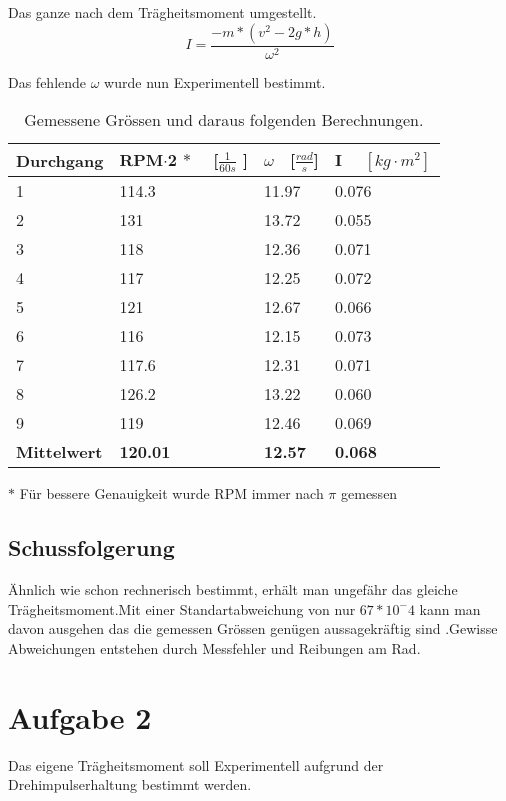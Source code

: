 \documentclass{article}
\begin{document}
Das ganze nach dem Trägheitsmoment umgestellt.
\begin{equation}
I=\frac{-m*(v^2-2g*h)}{\omega^2}
\end{equation}

Das fehlende $\omega$ wurde nun Experimentell bestimmt.


\begin{table}[H]
\center
    \begin{tabular}{|l|l|l|l|}
        \hline
        
  
        Durchgang & RPM$\cdot$2 $\ast$ $ \quad $[$\frac{1}{60s}$ ]   & $\omega \quad $[$\frac{rad}{s}$] & I $\quad [kg\cdot m^2]$ \\ \hline
        1         & 114.3 & 11.97 & 0.076 \\ 
        2         & 131   & 13.72 & 0.055 \\ 
        3         & 118   & 12.36 & 0.071 \\ 
        4         & 117   & 12.25 & 0.072 \\ 
        5         & 121   & 12.67 & 0.066 \\ 
        6         & 116   & 12.15 & 0.073 \\ 
        7         & 117.6 & 12.31 & 0.071 \\ 
        8         & 126.2 & 13.22 & 0.060 \\ 
        9         & 119   & 12.46 & 0.069 \\ \hline
        			\textbf{Mittelwert}&\textbf{120.01}&\textbf{12.57}&\textbf{0.068}\\
        \hline
  
    \end{tabular}
    \caption{Gemessene Grössen und daraus folgenden Berechnungen.}
      $\ast$  Für bessere Genauigkeit wurde RPM immer nach $\pi$ gemessen

\end{table}
\subsection{Schussfolgerung}

Ähnlich wie schon rechnerisch bestimmt, erhält man ungefähr das gleiche Trägheitsmoment.Mit einer Standartabweichung von nur $67*10^-4$ kann man davon ausgehen das die gemessen Grössen genügen aussagekräftig sind .Gewisse Abweichungen entstehen durch Messfehler und Reibungen am Rad.\newpage


\section{Aufgabe 2}
Das eigene Trägheitsmoment soll Experimentell aufgrund der Drehimpulserhaltung bestimmt werden.     
\end{document}
